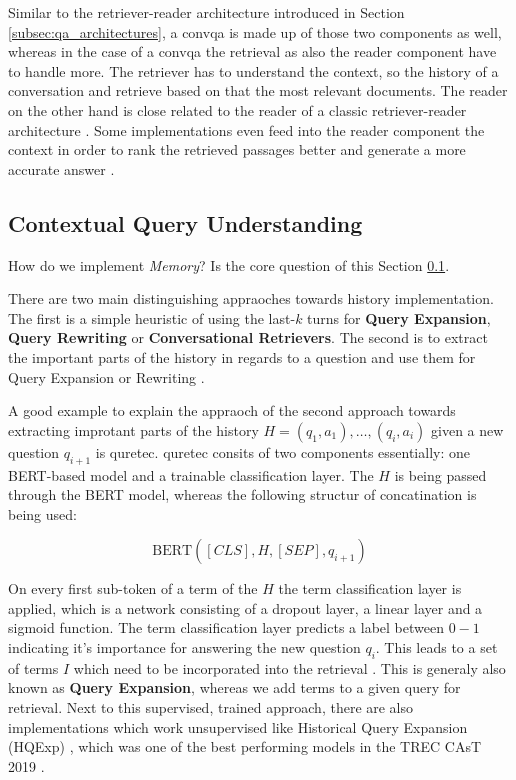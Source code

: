 Similar to the retriever-reader architecture introduced in Section \ref{subsec:qa_architectures}, a \gls{convqa} is made up of those two components as well, whereas in the case of a \gls{convqa} the retrieval as also the reader component have to handle more. The retriever has to understand the context, so the history of a conversation and retrieve based on that the most relevant documents. The reader on the other hand is close related to the reader of a classic retriever-reader architecture \cite{zamani_conversational_2023,gao_neural_2022}. Some implementations even feed into the reader component the context in order to rank the retrieved passages better and generate a more accurate answer \cite{owoicho_trec_2022}.

\subsection{Contextual Query Understanding}
\label{subsec:cqa_contextual_query_understanding}

How do we implement \textit{Memory}? Is the core question of this Section \ref{subsec:cqa_contextual_query_understanding}. 

There are two main distinguishing appraoches towards history implementation. The first is a simple heuristic of using the last-$k$ turns for \textbf{Query Expansion}, \textbf{Query Rewriting} or \textbf{Conversational Retrievers}. The second is to extract the important parts of the history in regards to a question and use them for Query Expansion or Rewriting \cite{gao_neural_2022}.

A good example to explain the appraoch of the second approach towards extracting improtant parts of the history $H = {(q_1, a_1), \dots , (q_i, a_i)}$ given a new question $q_{i+1}$ is \gls{quretec}\cite{voskarides_query_2020}. \gls{quretec} consits of two components essentially: one BERT-based model and a trainable classification layer. The $H$ is being passed through the BERT model, whereas the following structur of concatination is being used: 

\begin{equation}
    \text{BERT}([CLS],H,[SEP],q_{i+1}) 
\end{equation}

On every first sub-token of a term of the $H$ the term classification layer is applied, which is a network consisting of a dropout layer, a linear layer and a sigmoid function. The term classification layer predicts a label between $0-1$ indicating it's importance for answering the new question $q_i$. This leads to a set of terms $I$ which need to be incorporated into the retrieval \cite{voskarides_query_2020}. This is generaly also known as \textbf{Query Expansion}, whereas we add terms to a given query for retrieval. Next to this supervised, trained approach, there are also implementations which work unsupervised like Historical Query Expansion (HQExp) \cite{yang_query_2019}, which was one of the best performing models in the TREC CAsT 2019 \cite{dalton_trec_2020}.

